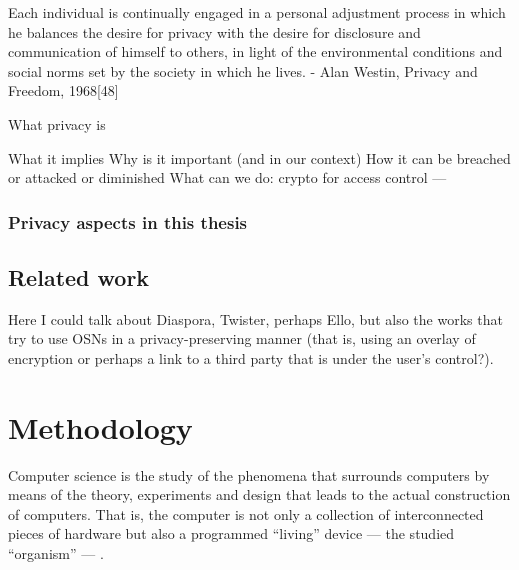 \documentclass[showtrims]{kthesis}
\begin{document}
Each individual is continually engaged in a personal adjustment process in which he balances the desire for privacy with the desire for disclosure and communication of himself to others, in light of the environmental conditions and social norms set by the society in which he lives. - Alan Westin, Privacy and Freedom, 1968[48]


What privacy is


What it implies
Why is it important (and in our context)
How it can be breached or attacked or diminished
What can we do: crypto for access control
---

%
%
%

\subsection{Privacy aspects in this thesis}

\section{Related work}

Here I could talk about Diaspora, Twister, perhaps Ello, but also the works that try to 
use OSNs in a privacy-preserving manner (that is, using an overlay of encryption 
or perhaps a link to a third party that is under the user's control?).

\chapter{Methodology}
Computer science is the study of the phenomena that surrounds computers by means 
of the theory, experiments and design that leads to the actual construction of computers. 
That is, the computer is not only a collection of interconnected pieces of hardware 
but also a programmed ``living'' device --- the studied ``organism'' --- \cite{NewellS76}.
\end{document}
